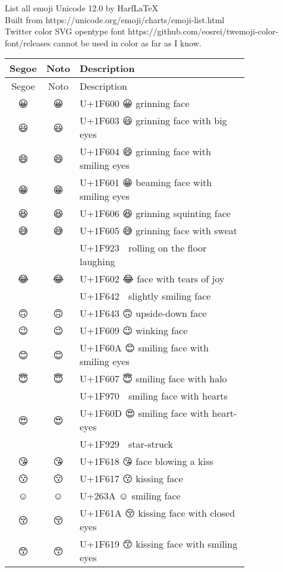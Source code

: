 \documentclass[a4paper,12pt]{article}
\newcommand{\fontA}[1]{{\fontspec[RawFeature={mode=harf,+dist,+ccmp}]{Segoe UI Emoji} #1}}
\newcommand{\fontB}[1]{{\fontspec[RawFeature={mode=harf,+dist,+ccmp}]{Noto Color Emoji} #1}}
\begin{document}
\noindent
List all emoji Unicode 12.0 by HarfLaTeX\\
Built from https://unicode.org/emoji/charts/emoji-list.html\\
Twitter color SVG opentype font https://github.com/eosrei/twemoji-color-font/releases cannot be used in color as far as I know.


\noindent
\begin{longtable}[c]{ccp{0.8\linewidth}}
Segoe&Noto&Description\\\hline
\endfirsthead  
Segoe&Noto&Description\\\hline
\endhead  
\fontA{😀}&\fontB{😀}&U+1F600 😀 grinning face\\
\fontA{😃}&\fontB{😃}&U+1F603 😃 grinning face with big eyes\\
\fontA{😄}&\fontB{😄}&U+1F604 😄 grinning face with smiling eyes\\
\fontA{😁}&\fontB{😁}&U+1F601 😁 beaming face with smiling eyes\\
\fontA{😆}&\fontB{😆}&U+1F606 😆 grinning squinting face\\
\fontA{😅}&\fontB{😅}&U+1F605 😅 grinning face with sweat\\
\fontA{🤣}&\fontB{🤣}&U+1F923 🤣 rolling on the floor laughing\\
\fontA{😂}&\fontB{😂}&U+1F602 😂 face with tears of joy\\
\fontA{🙂}&\fontB{🙂}&U+1F642 🙂 slightly smiling face\\
\fontA{🙃}&\fontB{🙃}&U+1F643 🙃 upside-down face\\
\fontA{😉}&\fontB{😉}&U+1F609 😉 winking face\\
\fontA{😊}&\fontB{😊}&U+1F60A 😊 smiling face with smiling eyes\\
\fontA{😇}&\fontB{😇}&U+1F607 😇 smiling face with halo\\
\fontA{🥰}&\fontB{🥰}&U+1F970 🥰 smiling face with hearts\\
\fontA{😍}&\fontB{😍}&U+1F60D 😍 smiling face with heart-eyes\\
\fontA{🤩}&\fontB{🤩}&U+1F929 🤩 star-struck\\
\fontA{😘}&\fontB{😘}&U+1F618 😘 face blowing a kiss\\
\fontA{😗}&\fontB{😗}&U+1F617 😗 kissing face\\
\fontA{☺}&\fontB{☺}&U+263A ☺ smiling face\\
\fontA{😚}&\fontB{😚}&U+1F61A 😚 kissing face with closed eyes\\
\fontA{😙}&\fontB{😙}&U+1F619 😙 kissing face with smiling eyes\\

\end{longtable}
\end{document}
